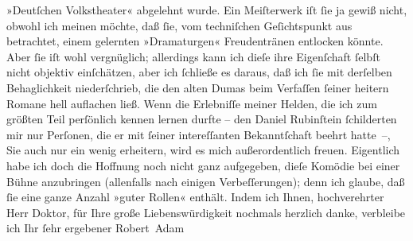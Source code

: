 \begin{ledgroupsized}[t]{13cm}
                        »Deutſchen Volkstheater« abgelehnt wurde.
                    Ein Meiſterwerk iſt ſie ja gewiß nicht, obwohl ich meinen möchte, daß ſie, vom
                    techniſchen Geſichtspunkt aus betrachtet, einem gelernten »Dramaturgen«
                    Freudentränen entlocken könnte. Aber ſie iſt {\pb}wohl
                    vergnüglich; allerdings kann ich dieſe ihre Eigenſchaft ſelbſt nicht objektiv
                    einſchätzen, aber ich ſchließe es daraus, daß ich ſie mit derſelben
                    Behaglichkeit niederſchrieb, die den alten Dumas beim Verfaſſen ſeiner heitern Romane hell auflachen ließ. Wenn
                    die Erlebniſſe meiner Helden, die ich zum größten Teil perſönlich kennen lernen
                    durfte – den Daniel Rubinſtein ſchilderten mir nur Perſonen, die er mit ſeiner
                    intereſſanten Bekanntſchaft beehrt hatte –, Sie auch nur ein wenig erheitern,
                    wird es mich außerordentlich freuen. Eigentlich habe ich doch die Hoffnung noch
                    nicht ganz aufgegeben, dieſe Komödie bei einer Bühne anzubringen (allenfalls
                    nach einigen Verbeſſerungen); denn ich glaube, daß ſie eine ganze Anzahl »guter
                    Rollen« enthält.\pend
           \pstart
           Indem ich Ihnen, hochverehrter Herr Doktor, für Ihre große Liebenswürdigkeit
                    nochmals herzlich danke, verbleibe ich Ihr ſehr ergebener\pend
           \pstart \spacefill\mbox{Robert Adam}\pend{}
         
         \endnumbering{}\end{ledgroupsized}  \newcommand{\dateiname}{L02209}\newcommand{\titel}{Robert Adam an Arthur Schnitzler, 22. 6. 1915}\newcommand{\editorInnen}{Martin Anton Müller und Gerd-Hermann Susen}
      